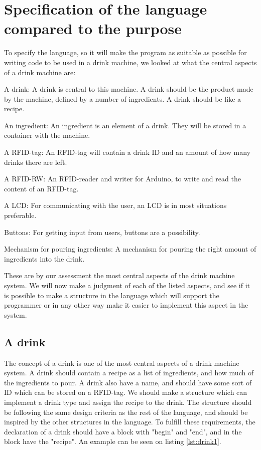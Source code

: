 

\section{Specification of the language compared to the purpose}
To specify the language, so it will make the program as suitable as possible for writing code to be used in a drink machine, we looked at what the central aspects of a drink machine are:
\begin{inddes}
\item[A drink:] A drink is central to this machine. A drink should be the product made by the machine, defined by a number of ingredients. A drink should be like a recipe.
\item[An ingredient:] An ingredient is an element of a drink. They will be stored in a container with the machine. 
\item[A RFID-tag:] An RFID-tag will contain a drink ID and an amount of how many drinks there are left.
\item[A RFID-RW:] An RFID-reader and writer for Arduino, to write and read the content of an RFID-tag.
\item[A LCD:] For communicating with the user, an LCD is in most situations preferable.
\item[Buttons:] For getting input from users, buttons are a possibility. 
\item[Mechanism for pouring ingredients:] A mechanism for pouring the right amount of ingredients into the drink.
\end{inddes}
These are by our assessment the most central aspects of the drink machine system. We will now make a judgment of each of the listed aspects, and see if it is possible to make a structure in the language which will support the programmer or in any other way make it easier to implement this aspect in the system.
\subsection{A drink}
The concept of a drink is one of the most central aspects of a drink machine system. A drink should contain a recipe as a list of ingredients, and how much of the ingredients to pour. A drink also have a name, and should have some sort of ID which can be stored on a RFID-tag. We should make a structure which can implement a drink type and assign the recipe to the drink. The structure should be following the same design criteria as the rest of the language, and should be inspired by the other structures in the language. To fulfill these requirements, the declaration of a drink should have a block with "begin" and "end", and in the block have the "recipe". An example can be seen on listing \ref{lst:drink1}.

